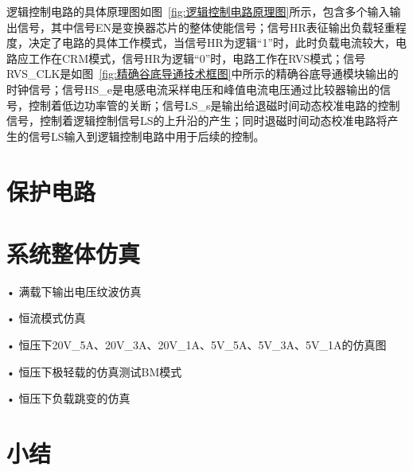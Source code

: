 逻辑控制电路的具体原理图如图~\ref{fig:逻辑控制电路原理图}所示，包含多个输入输出信号，其中信号EN是变换器芯片的整体使能信号；信号HR表征输出负载轻重程度，决定了电路的具体工作模式，当信号HR为逻辑“1”时，此时负载电流较大，电路应工作在CRM模式，信号HR为逻辑“0”时，电路工作在RVS模式；信号RVS\_CLK是如图~\ref{fig:精确谷底导通技术框图}中所示的精确谷底导通模块输出的时钟信号；信号HS\_e是电感电流采样电压和峰值电流电压通过比较器输出的信号，控制着低边功率管的关断；信号LS\_s是输出给退磁时间动态校准电路的控制信号，控制着逻辑控制信号LS的上升沿的产生；同时退磁时间动态校准电路将产生的信号LS输入到逻辑控制电路中用于后续的控制。


\section{保护电路}

\section{系统整体仿真}

• 满载下输出电压纹波仿真

• 恒流模式仿真

• 恒压下20V\_5A、20V\_3A、20V\_1A、5V\_5A、5V\_3A、5V\_1A的仿真图

• 恒压下极轻载的仿真测试BM模式

• 恒压下负载跳变的仿真



\section{小结}





